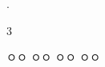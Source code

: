 
                   {
\begin{questionbox}{\thechapter. \QuestionNumberumber}

\end{questionbox}

\begin{solbox}{3}
\bnset
{}


\bn \zzz

\bnset
{}
\bn \zzz

\bnset
{}
\bn \zzz

 ㅇㅇ \zzz
{} ㅇㅇ \zzz
{} ㅇㅇ \zzz
{} ㅇㅇ
\end{solbox}
\clearpage}
